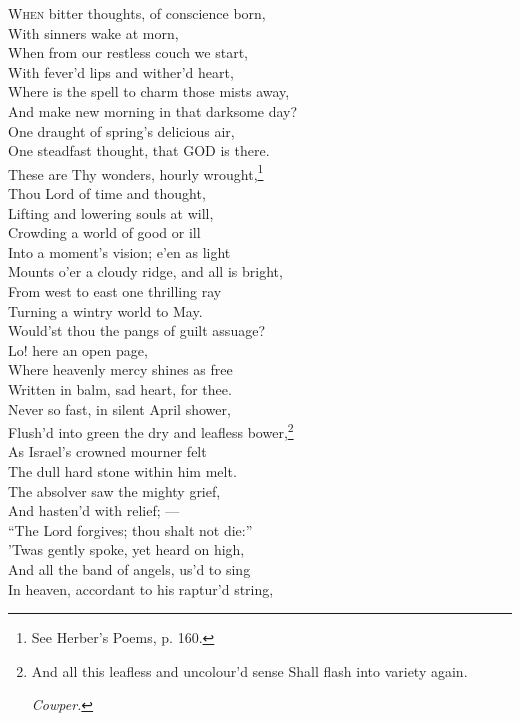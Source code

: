 \textsc{When} bitter thoughts, of conscience born, \\
 With sinners wake at morn, \\
 When from our restless couch we start, \\
 With fever’d lips and wither’d heart, \\
 Where is the spell to charm those mists away, \\
 And make new morning in that darksome day? \\
 One draught of spring’s delicious air, \\
 One steadfast thought, that GOD is there. \\
  These are Thy wonders, hourly wrought,\footnote{See Herber’s Poems, p. 160.} \\
 Thou Lord of time and thought, \\
 Lifting and lowering souls at will, \\
 Crowding a world of good or ill \\
 Into a moment’s vision; e’en as light \\
 Mounts o’er a cloudy ridge, and all is bright, \\
 From west to east one thrilling ray \\
 Turning a wintry world to May. \\
  Would’st thou the pangs of guilt assuage? \\
 Lo! here an open page, \\
 Where heavenly mercy shines as free \\
 Written in balm, sad heart, for thee. \\
 Never so fast, in silent April shower, \\
 Flush’d into green the dry and leafless bower,\footnote{And all this leafless and uncolour’d sense Shall flash into variety again. \par \emph{Cowper.}} \\
 As Israel’s crowned mourner felt \\
 The dull hard stone within him melt. \\
  The absolver saw the mighty grief, \\
 And hasten’d with relief; — \\
 “The Lord forgives; thou shalt not die:” \\
 ’Twas gently spoke, yet heard on high, \\
 And all the band of angels, us’d to sing \\
 In heaven, accordant to his raptur’d string, \\
